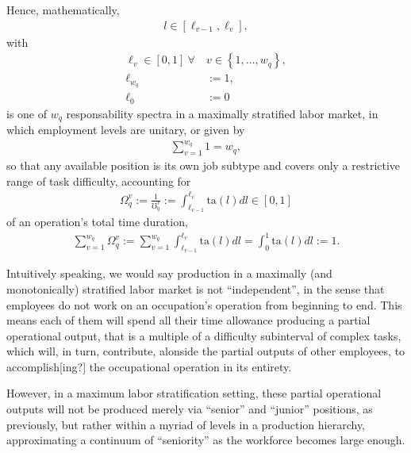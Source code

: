 \documentclass[hidelinks, nonatbib]{elsarticle}
\begin{document}
\begin{definition}
    \label{mmls_def}
    Hence, mathematically,
    \begin{gather}
    l \in \left[
    \ell_{v-1}
    ,
    \ell_{v}
    \right]
    ,
    \end{gather}
    with
    \begin{align}
    \ell_{v} \in [0,1]
    \
    \forall
    \
    &v \in 
    \left\{
        1, \dots, w_q
    \right\}
    ,
    \\
    \ell_{w_q} &:= 1
    ,
    \\
    \ell_0 &:= 0
    \end{align}
    is one of $w_q$ responsability spectra in a maximally stratified labor market, in which employment levels are unitary, or given by
    \begin{gather}
    \sum_{v=1}^{w_q}
    1
    =
    w_q
    ,
    \end{gather}
    so that any available position is its own job subtype and covers only a restrictive range of task difficulty, accounting for
    \begin{gather}
    \Omega_{q}^{v}
    := 
    \frac{1}{\mho_{q}^{v}}
    := 
    \int_{
        \ell_{v-1}
    }^{
        \ell_{v}
    }
    \text{ta}(l)dl
    \in [0,1]
    \end{gather}
    of an operation's total time duration,
    \begin{gather}
    \sum_{v=1}^{w_q}
    \Omega_{q}^{v} 
    := 
    \sum_{v=1}^{w_q}
    \int_{
        \ell_{v-1}
    }^{
        \ell_{v}
    }
    \text{ta}(l)dl
    =
    \int_{0}^{1}
    \text{ta}(l)dl
    :=
    1
    .
    \end{gather}
    
    Intuitively speaking, we would say production in a maximally (and monotonically) stratified labor market is not ``independent'', in the sense that employees do not work on an occupation's operation from beginning to end. This means each of them will spend all their time allowance producing a partial operational output, that is a multiple of a difficulty subinterval of complex tasks, which will, in turn, contribute, alonside the partial outputs of other employees, to accomplish[ing?] the occupational operation in its entirety.
    
    However, in a maximum labor stratification setting, these partial operational outputs will not be produced merely via ``senior'' and ``junior'' positions, as previously, but rather within a myriad of levels in a production hierarchy, approximating a continuum of ``seniority'' as the workforce becomes large enough.
    

\end{definition}
\end{document}
